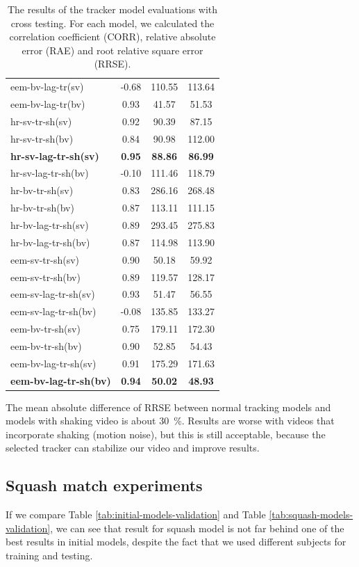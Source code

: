 \begin{table}[!htb]
{\begin{tabular}{l S[table-format=3.2, detect-weight, detect-shape, detect-mode] S[table-format=3.2, detect-weight, detect-shape, detect-mode] S[table-format=3.2, detect-weight, detect-shape, detect-mode]}
        eem-bv-lag-tr(sv)	&	-0.68	&	110.55	&	113.64	\\
        eem-bv-lag-tr(bv)	&	0.93	&	41.57	&	51.53	\\
        hr-sv-tr-sh(sv)	&	0.92	&	90.39	&	87.15	\\
        hr-sv-tr-sh(bv)	&	0.84	&	90.98	&	112.00 \\
        \bfseries hr-sv-lag-tr-sh(sv)	&	\bfseries 0.95	&	\bfseries 88.86 	&	\bfseries 86.99	\\
        hr-sv-lag-tr-sh(bv)	&	-0.10	&	111.46	&	118.79	\\
        hr-bv-tr-sh(sv)	&	0.83	&	286.16	&	268.48	\\
        hr-bv-tr-sh(bv)	&	0.87	&	113.11	&	111.15	\\
        hr-bv-lag-tr-sh(sv)	&	0.89	&	293.45	&	275.83	\\
        hr-bv-lag-tr-sh(bv)	&	0.87	&	114.98	&	113.90	\\
        eem-sv-tr-sh(sv)	&	0.90	&	50.18	&	59.92	\\
        eem-sv-tr-sh(bv)	&	0.89	&	119.57	&	128.17	\\
        eem-sv-lag-tr-sh(sv)	&	0.93	&	51.47	&	56.55	\\
        eem-sv-lag-tr-sh(bv)	&	-0.08	&	135.85	&	133.27	\\
        eem-bv-tr-sh(sv)	&	0.75	&	179.11	&	172.30	\\
        eem-bv-tr-sh(bv)	&	0.90	&	52.85	&	54.43	\\
        eem-bv-lag-tr-sh(sv)	&	0.91	&	175.29	&	171.63	\\
        \bfseries eem-bv-lag-tr-sh(bv)	&	\bfseries 0.94	&	\bfseries 50.02	&	\bfseries 48.93	\\
          \bottomrule        
      \end{tabular}
	}
	\caption{The results of the tracker model evaluations with cross testing. For each model, we calculated the correlation coefficient (CORR), relative absolute error (RAE) and root relative square error (RRSE).}
	\label{tab:tracker-models-validation}
\end{table}

The mean absolute difference of RRSE between normal tracking models and models with shaking video is about \SI{30}{\%}. Results are worse with videos that incorporate shaking (motion noise), but this is still acceptable, because the selected tracker can stabilize our video and improve results.

\subsection{Squash match experiments}
If we compare Table \ref{tab:initial-models-validation} and Table \ref{tab:squash-models-validation}, we can see that result for squash model is not far behind one of the best results in initial models, despite the fact that we used different subjects for training and testing. 

